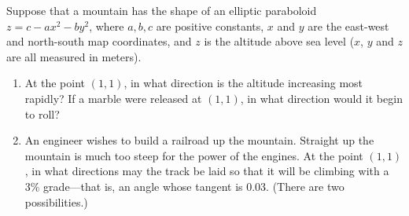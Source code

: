 
\begin{question}
Suppose that a mountain has the shape of an elliptic paraboloid $z = c - ax^2 - by^2$, where $a,b,c$ are positive constants, $x$ and $y$ are the east-west and north-south map coordinates, and $z$ is the altitude above sea level ($x$, $y$ and $z$ are all measured in meters). 
\begin{enumerate}
\item
At the point $(1,1)$, in what direction is the altitude increasing most rapidly? If a marble were released at $(1,1)$, in what direction would it begin to roll?
\item
An engineer wishes to build a railroad up the mountain. Straight up the mountain is much too steep for the power of the engines. At the point $(1,1)$, in what directions may the track be laid so that it will be climbing with a 3\% grade---that is, an angle whose tangent is 0.03. (There are two possibilities.) 
\end{enumerate}
\end{question}

